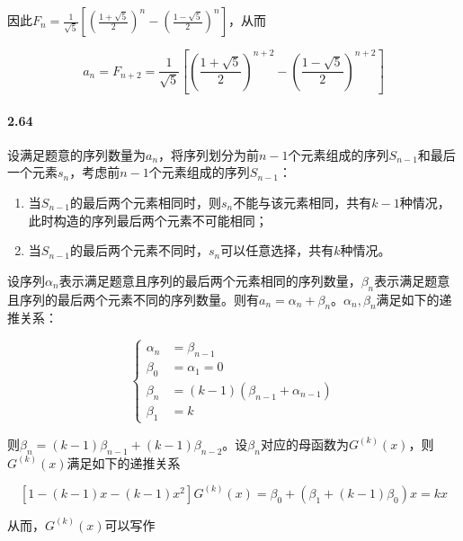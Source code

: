 \documentclass{../notes}
\newcommand{\Gx}[1]{G^{(#1)}(x)}
\begin{document}
    因此$F_{n} = \frac{1}{\sqrt 5} \left[\left(\frac{1 + \sqrt 5}{2}\right)^n - \left(\frac{1 - \sqrt 5}{2}\right)^n\right]$，从而

    \begin{equation}
        a_{n} = F_{n+2} =\frac{1}{\sqrt 5} \left[\left(\frac{1 + \sqrt 5}{2}\right)^{n+2} - \left(\frac{1 - \sqrt 5}{2}\right)^{n+2}\right]
    \end{equation}

    \paragraph*{2.64} 设满足题意的序列数量为$a_n$，将序列划分为前$n-1$个元素组成的序列$S_{n-1}$和最后一个元素$s_n$，考虑前$n-1$个元素组成的序列$S_{n-1}$：

    \begin{enumerate}
        \item 当$S_{n-1}$的最后两个元素相同时，则$s_n$不能与该元素相同，共有$k-1$种情况，此时构造的序列最后两个元素不可能相同；
        \item 当$S_{n-1}$的最后两个元素不同时，$s_n$可以任意选择，共有$k$种情况。
    \end{enumerate}

    设序列$\alpha_n$表示满足题意且序列的最后两个元素相同的序列数量，$\beta_n$表示满足题意且序列的最后两个元素不同的序列数量。则有$a_n = \alpha_n + \beta_n$。$\alpha_n, \beta_n$满足如下的递推关系：

    \begin{equation}
        \left\{
        \begin{aligned}
            \alpha_n &= \beta_{n-1}\\
            \beta_0 &= \alpha_1 = 0 \\
            \beta_n &= (k-1)(\beta_{n-1} + \alpha_{n-1})\\
            \beta_1 &= k
        \end{aligned}
        \right.
    \end{equation}

    则$\beta_n = (k - 1)\beta_{n-1} + (k-1)\beta_{n-2}$。设$\beta_n$对应的母函数为$\Gx k$，则$\Gx k$满足如下的递推关系
    
    \begin{equation}
        \left[1 - (k-1)x - (k-1)x^2\right]\Gx k = \beta_0 + (\beta_1 + (k-1)\beta_0) x = kx
    \end{equation}

    从而，$\Gx k$可以写作
\end{document}
